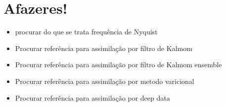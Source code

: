\documentclass[12pt,a4paper]{article}
\begin{document}
	
	\section{Afazeres!}
	\begin{itemize}
		\item{procurar do que se trata frequência de Nyquist}
		\item{Procurar referência para assimilação por filtro de Kalmom}
		\item{Procurar referência para assimilação por filtro de Kalmom ensemble}
		\item{Procurar referência para assimilação por metodo varicional}
		\item{Procurar referência para assimilação por deep data}
	\end{itemize}
	
	\pagebreak
	
	
	
\end{document}
